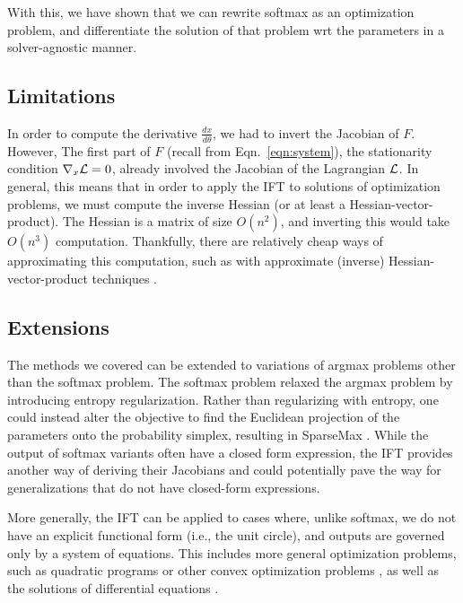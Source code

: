 \documentclass[11pt]{article}
\begin{document}
With this, we have shown that we can rewrite softmax as an optimization problem,
and differentiate the solution of that problem wrt the parameters in a solver-agnostic
manner.


\subsection{Limitations}
In order to compute the derivative $\frac{dx}{d\theta}$, we had to invert the Jacobian of $F$.
However, The first part of $F$ (recall from Eqn.~\ref{eqn:system}), the stationarity condition $\nabla_x\mathcal{L} = 0$,
already involved the Jacobian of the Lagrangian $\mathcal{L}$.
In general, this means that in order to apply the IFT to solutions of optimization problems,
we must compute the inverse Hessian (or at least a Hessian-vector-product).
The Hessian is a matrix of size $O(n^2)$, and inverting this would take $O(n^3)$ computation.
Thankfully, there are relatively cheap ways of approximating this computation,
such as with approximate (inverse) Hessian-vector-product techniques
\citep{rajeswaran2019imaml,lorraine2019hoift}.

\subsection{Extensions}
The methods we covered can be extended to variations of argmax problems
other than the softmax problem.
The softmax problem relaxed the argmax problem by introducing entropy regularization.
Rather than regularizing with entropy, one could instead alter the objective to find
the Euclidean projection of the parameters onto the probability simplex,
resulting in SparseMax \citep{sparsemax}.
While the output of softmax variants often have a closed form expression,
the IFT provides another way of deriving their Jacobians
and could potentially pave the way for generalizations
that do not have closed-form expressions.

More generally, the IFT can be applied to cases where, unlike softmax,
we do not have an explicit functional form (i.e., the unit circle),
and outputs are governed only by a system of equations.
This includes more general optimization problems, such as quadratic programs \citep{optnet}
or other convex optimization problems \citep{agrawal2019diffcvx},
as well as the solutions of differential equations \citep{neuralode}.
\end{document}
